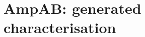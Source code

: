 \documentclass[11pt]{article}
\begin{document}
\section*{AmpAB: generated characterisation}

\end{document}
